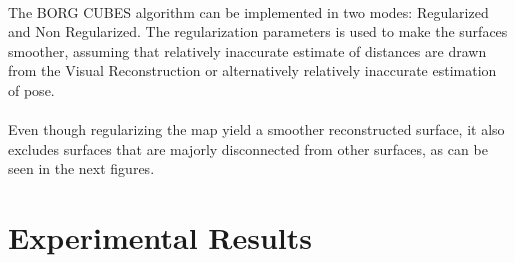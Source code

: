 \documentclass[12pt]{article}
\begin{document}
	\paragraph{}
	The BORG CUBES algorithm can be implemented in two modes: Regularized and Non Regularized. The regularization parameters is used to make the surfaces smoother, assuming that relatively inaccurate estimate of distances are drawn from the Visual Reconstruction or alternatively relatively inaccurate estimation of pose.
	
	\paragraph{}
	Even though regularizing the map yield a smoother reconstructed surface, it also excludes surfaces that are majorly disconnected from other surfaces, as can be seen in the next figures.
	
	
		
	
	\newpage
	\section{Experimental Results}
\end{document}
